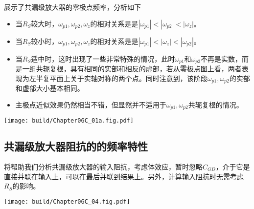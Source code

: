 展示了共漏级放大器的零极点频率，分析如下
\begin{itemize}
    \item 当$R_S$较大时，$\omega_{p1},\omega_{p2},\omega_z$的相对关系是是$|\omega_{p1}|<|\omega_{p2}|<|\omega_{z}|$。
    \item 当$R_S$较小时，$\omega_{p1},\omega_{p2},\omega_z$的相对关系是是$|\omega_{p1}|<|\omega_{z}|<|\omega_{p2}|$。
    \item 当$R_S$适中时，这时出现了一些非常特殊的情况，此时$\omega_{p1}$和$\omega_{p2}$不再是实数，而是一组共轭复根，具有相同的实部和相反的虚部，若从零极点图上看，两者表现为左半复平面上关于实轴对称的两个点。同时注意到，该阶段$\omega_{p1},\omega_{p2}$的实部和虚部大小基本相同。
    \item 主极点近似效果仍然相当不错，但显然并不适用于$\omega_{p1},\omega_{p2}$共轭复根的情况。
\end{itemize}

\begin{Figure}[共漏级放大器的零极点频率]
    \texttt{[image: build/Chapter06C\_01a.fig.pdf]}
\end{Figure}

\subsection{共漏级放大器阻抗的的频率特性}
将帮助我们分析共漏级放大器的输入阻抗，考虑体效应，暂时忽略$C_{GD}$，介于它是直接并联在输入上，可以在最后并联到结果上。另外，计算输入阻抗时无需考虑$R_S$的影响。

\begin{Figure}[共漏级放大器的输入阻抗]
    \texttt{[image: build/Chapter06C\_04.fig.pdf]}
\end{Figure}


